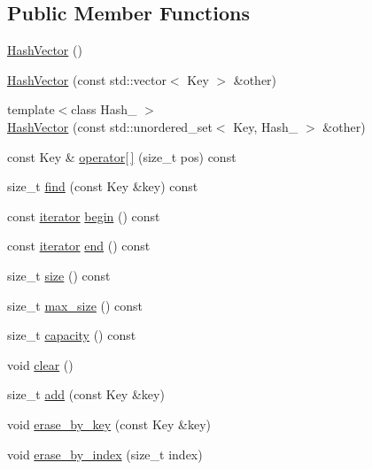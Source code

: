 \subsection*{Public Member Functions}
\begin{DoxyCompactItemize}
\item 
\mbox{\hyperlink{class_hash_vector_a17eb88e2d8322b662ac5972e7ed7aa88}{Hash\+Vector}} ()
\item 
\mbox{\hyperlink{class_hash_vector_a8f4c8d505e5cedfe24463ccf267ec5f9}{Hash\+Vector}} (const std\+::vector$<$ Key $>$ \&other)
\item 
{\footnotesize template$<$class Hash\+\_ $>$ }\\\mbox{\hyperlink{class_hash_vector_a673094903c45ef33c87f54cb5391210f}{Hash\+Vector}} (const std\+::unordered\+\_\+set$<$ Key, Hash\+\_ $>$ \&other)
\item 
const Key \& \mbox{\hyperlink{class_hash_vector_a6ec9410b623647597aee298b8798b644}{operator\mbox{[}$\,$\mbox{]}}} (size\+\_\+t pos) const
\item 
size\+\_\+t \mbox{\hyperlink{class_hash_vector_a505bf3ce92bf251105596a8c97b533d3}{find}} (const Key \&key) const
\item 
const \mbox{\hyperlink{class_hash_vector_1_1iterator}{iterator}} \mbox{\hyperlink{class_hash_vector_af63968bed76e89e08246154e4c233dc1}{begin}} () const
\item 
const \mbox{\hyperlink{class_hash_vector_1_1iterator}{iterator}} \mbox{\hyperlink{class_hash_vector_a65851ab7117e4ebfe3de7cdd926bf1a3}{end}} () const
\item 
size\+\_\+t \mbox{\hyperlink{class_hash_vector_a13a560f124221dce8944f21ec88600f9}{size}} () const
\item 
size\+\_\+t \mbox{\hyperlink{class_hash_vector_a8a46270688ee2d936c131546487882cc}{max\+\_\+size}} () const
\item 
size\+\_\+t \mbox{\hyperlink{class_hash_vector_adcb769646427cc00272f07b65d488158}{capacity}} () const
\item 
void \mbox{\hyperlink{class_hash_vector_a7a31136b1ede5d312c60c863b8ead712}{clear}} ()
\item 
size\+\_\+t \mbox{\hyperlink{class_hash_vector_a24ee21cdb0db0bd29b86c7649eaa6b5e}{add}} (const Key \&key)
\item 
void \mbox{\hyperlink{class_hash_vector_afe9cb230bcd8339578a6662f92b32a4e}{erase\+\_\+by\+\_\+key}} (const Key \&key)
\item 
void \mbox{\hyperlink{class_hash_vector_a1524c108e36d8809d27c081434b9795d}{erase\+\_\+by\+\_\+index}} (size\+\_\+t index)

\end{DoxyCompactItemize}
